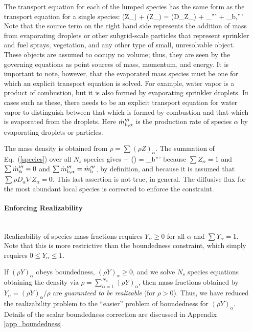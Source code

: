 The transport equation for each of the lumped species has the same form as the transport equation for a single species:
\be {}(\rho Z_\alpha) + \nabla\!\cdot (\rho Z_\alpha \bu) = \nabla\!\cdot (\rho D_\alpha \nabla Z_\alpha) + \dm_\alpha''' + \dm_{\rm b,\alpha}''' \label{species} \ee
Note that the source term on the right hand side represents the addition of mass from evaporating droplets or other subgrid-scale
particles that represent sprinkler and fuel sprays, vegetation, and any other type of small, unresolvable object. These
objects are assumed to occupy no volume; thus, they are seen by the governing equations as point sources of mass, momentum, and energy. It is important to
note, however, that the evaporated mass species must be one for which an explicit transport equation is solved. For example, water vapor is a product of
combustion, but it is also formed by evaporating sprinkler droplets. In cases such as these, there needs to be an explicit transport equation for water
vapor to distinguish between that which is formed by combustion and that which is evaporated from the droplets. Here $\dot{m}_{\rm b,\alpha}'''$ is the production rate of species $\alpha$ by evaporating droplets or particles.

The mass density is obtained from $\rho = \sum (\rho Z)_\alpha$.  The summation of Eq.~(\ref{species}) over all $N_s$ species gives
\be {} + \nabla\!\cdot (\rho \bu)  =  \dm_{\rm b}'''  \label{mass} \ee
because $\sum Z_\alpha=1$ and $\sum \dot{m}_\alpha''' = 0$ and $\sum \dot{m}_{\rm b,\alpha}'''=\dot{m}_{\rm b}'''$, by definition, and because it is assumed that $\sum \rho D_\alpha \nabla Z_\alpha = 0$. This last assertion is not true, in general.  The diffusive flux for the most abundant local species is corrected to enforce the constraint.




\paragraph{Enforcing Realizability} ~\\

\noindent Realizability of species mass fractions requires $Y_\alpha \ge 0$ for all $\alpha$ and $\sum Y_\alpha = 1$.  Note that this is more restrictive than the boundedness constraint, which simply requires $0 \le Y_\alpha \le 1$.

If $(\rho Y)_\alpha$ obeys boundedness, $(\rho Y)_\alpha \ge 0$, and we solve $N_s$ species equations obtaining the density via $\rho = \sum_{\alpha=1}^{N_s} (\rho Y)_\alpha$, then mass fractions obtained by $Y_\alpha = (\rho Y)_\alpha/\rho$ are \emph{guaranteed to be realizable} (for $\rho>0$).  Thus, we have reduced the realizability problem to the ``easier'' problem of boundedness for $(\rho Y)_\alpha$. Details of the scalar boundedness correction are discussed in Appendix \ref{app_boundedness}.

